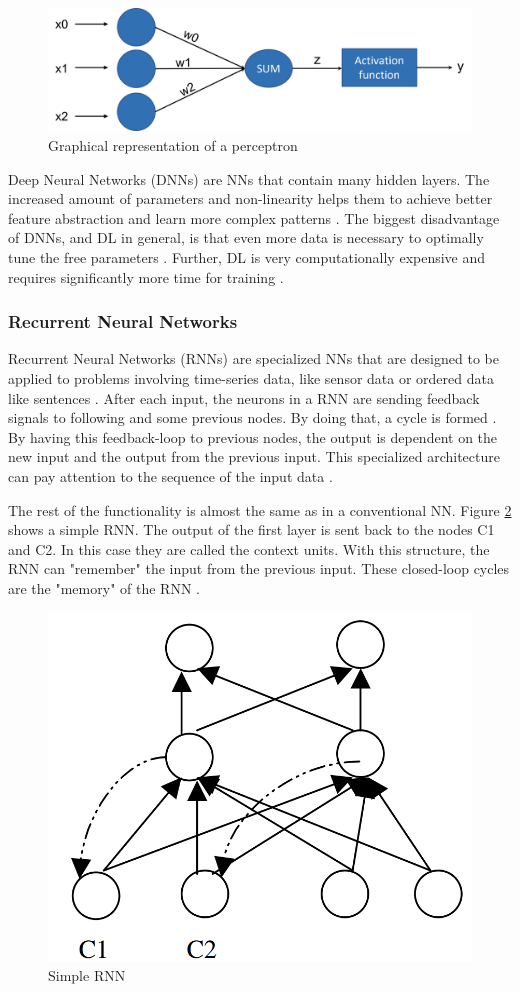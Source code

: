 \begin{figure}[H]
	\centering
	\includegraphics[width=0.8\linewidth]{IMGs/PEC.png}
	\caption{Graphical representation of a perceptron \cite{Ding}}
	\label{fig:PC}
\end{figure}
Deep Neural Networks (DNNs) are NNs that contain many hidden layers. The increased amount of parameters and non-linearity helps them to achieve better feature abstraction and learn more complex patterns \cite{JOOST}.
The biggest disadvantage of DNNs, and DL in general, is that even more data is necessary to optimally tune the free parameters \cite{Thompson}. Further, DL is very computationally expensive and requires significantly more time for training \cite{Fu}. 





\subsubsection*{Recurrent Neural Networks}
Recurrent Neural Networks (RNNs) are specialized NNs that are designed to be applied to problems involving time-series data, like sensor data or ordered data like sentences \cite{Jain}. After each input, the neurons in a RNN are sending feedback signals to following and some previous nodes. By doing that, a cycle is formed \cite{Grossberg}. By having this feedback-loop to previous nodes, the output is dependent on the new input and the output from the previous input. This specialized architecture can pay attention to the sequence of the input data \cite{Jain}.

The rest of the functionality is almost the same as in a conventional NN. Figure \ref{fig:rnn} shows a simple RNN. The output of the first  layer is sent back to the nodes C1 and C2. In this case they are called the context units. With this structure, the RNN can "remember" the input from the previous input. These closed-loop cycles are the "memory" of the RNN \cite{Salehinejad}.

\begin{figure}[H]
	\centering
	\includegraphics[width=0.4\linewidth]{IMGs/rnn.png}
	\caption{Simple RNN \cite{Jain}}
	\label{fig:rnn}
\end{figure}

